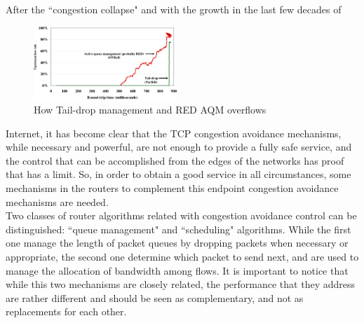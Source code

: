 After the ``congestion collapse" and with the growth in the last few decades of
 \begin{figure}
  \begin{center}
    \includegraphics[width=0.48\textwidth]{img/overflows}
  \end{center}
  \caption{How Tail-drop management and RED AQM overflows\cite{Dischinger2007CRB}}
  \label{tdredof}
\end{figure}

Internet, it has become clear that the TCP congestion avoidance mechanisms,
while necessary and powerful, are not enough to provide a fully safe service,
and the control that can be accomplished from the edges of the networks has
proof that has a limit. So, in order to obtain a good service in all
circumstances, some mechanisms in the routers to complement this endpoint
congestion avoidance mechanisms are needed.\\

Two classes of router algorithms related with congestion avoidance control can
be distinguished: ``queue management" and ``scheduling" algorithms. While the
first one manage the length of packet queues by dropping packets when necessary
or appropriate, the second one determine which packet to send next, and are used
to manage the allocation of bandwidth among flows. It is important to notice
that while this two mechanisms are closely related, the performance that they
address are rather different and should be seen as complementary, and not as
replacements for each other.\\



